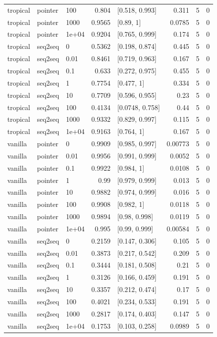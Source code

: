 \documentclass[10pt]{article}
\begin{document}
{\begin{longtable}{lllrlrrr}
tropical & pointer & 100 & 0.804 & [0.518, 0.993] & 0.311 & 5 & 0\\
tropical & pointer & 1000 & 0.9565 & [0.89, 1] & 0.0785 & 5 & 0\\
tropical & pointer & 1e+04 & 0.9204 & [0.765, 0.999] & 0.174 & 5 & 0\\
tropical & seq2seq & 0 & 0.5362 & [0.198, 0.874] & 0.445 & 5 & 0\\
tropical & seq2seq & 0.01 & 0.8461 & [0.719, 0.963] & 0.167 & 5 & 0\\
tropical & seq2seq & 0.1 & 0.633 & [0.272, 0.975] & 0.455 & 5 & 0\\
tropical & seq2seq & 1 & 0.7754 & [0.477, 1] & 0.334 & 5 & 0\\
tropical & seq2seq & 10 & 0.7709 & [0.596, 0.955] & 0.23 & 5 & 0\\
tropical & seq2seq & 100 & 0.4134 & [0.0748, 0.758] & 0.44 & 5 & 0\\
tropical & seq2seq & 1000 & 0.9332 & [0.829, 0.997] & 0.115 & 5 & 0\\
tropical & seq2seq & 1e+04 & 0.9163 & [0.764, 1] & 0.167 & 5 & 0\\
vanilla & pointer & 0 & 0.9909 & [0.985, 0.997] & 0.00773 & 5 & 0\\
vanilla & pointer & 0.01 & 0.9956 & [0.991, 0.999] & 0.0052 & 5 & 0\\
vanilla & pointer & 0.1 & 0.9922 & [0.984, 1] & 0.0108 & 5 & 0\\
vanilla & pointer & 1 & 0.99 & [0.979, 0.999] & 0.013 & 5 & 0\\
vanilla & pointer & 10 & 0.9882 & [0.974, 0.999] & 0.016 & 5 & 0\\
vanilla & pointer & 100 & 0.9908 & [0.982, 1] & 0.0118 & 5 & 0\\
vanilla & pointer & 1000 & 0.9894 & [0.98, 0.998] & 0.0119 & 5 & 0\\
vanilla & pointer & 1e+04 & 0.995 & [0.99, 0.999] & 0.00584 & 5 & 0\\
vanilla & seq2seq & 0 & 0.2159 & [0.147, 0.306] & 0.105 & 5 & 0\\
vanilla & seq2seq & 0.01 & 0.3873 & [0.217, 0.542] & 0.209 & 5 & 0\\
vanilla & seq2seq & 0.1 & 0.3444 & [0.181, 0.508] & 0.21 & 5 & 0\\
vanilla & seq2seq & 1 & 0.3126 & [0.166, 0.459] & 0.191 & 5 & 0\\
vanilla & seq2seq & 10 & 0.3357 & [0.212, 0.474] & 0.17 & 5 & 0\\
vanilla & seq2seq & 100 & 0.4021 & [0.234, 0.533] & 0.191 & 5 & 0\\
vanilla & seq2seq & 1000 & 0.2817 & [0.174, 0.403] & 0.147 & 5 & 0\\
vanilla & seq2seq & 1e+04 & 0.1753 & [0.103, 0.258] & 0.0989 & 5 & 0\\
\bottomrule
\end{longtable}
}
\end{document}
